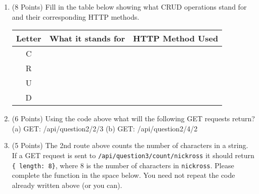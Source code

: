 \documentclass[11pt]{article}
\begin{document}
\begin{enumerate}
\item (8 Points) Fill in the table below showing what CRUD operations stand for and their corresponding HTTP methods. 


\begin{center}
	

\begin{tabular}{|c|p{8cm}|p{6cm}|}
\hline 
Letter & \centering What it stands for &  HTTP Method Used \\
\hline
C & & \\[1cm]
\hline
R & & \\[1cm]
\hline
U & & \\[1cm]
\hline
D & & \\[1cm]
\hline
\end{tabular}

\end{center}

\item (6 Points) Using the code above what will the following GET requests return?
\subitem (a) GET: /api/question2/2/3
\vspace{1cm}
\subitem (b) GET: /api/question2/4/2

\vspace{1cm}

\item (5 Points) The 2nd route above counts the number of characters in a string. If a GET request is sent to \newline \texttt{/api/question3/count/nickross} it should return \texttt{\{ \textquotesingle length\textquotesingle  : 8\}}, where 8 is the number of characters in \texttt{nickross}. Please complete the function in the space below. You need not repeat the code already written above (or you can).

\end{enumerate}
\end{document}
